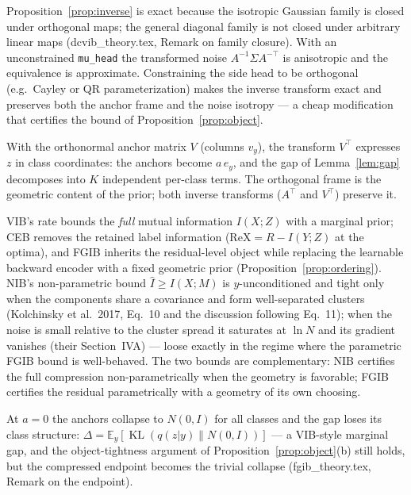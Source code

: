 \begin{remark}\label{rem:orth}
Proposition~\ref{prop:inverse} is exact because the isotropic Gaussian family is closed
under orthogonal maps; the general diagonal family is not closed under arbitrary linear
maps (dcvib\_theory.tex, Remark on family closure). With an unconstrained \texttt{mu\_head}
the transformed noise $A^{-1}\Sigma A^{-\top}$ is anisotropic and the equivalence is
approximate. Constraining the side head to be orthogonal (e.g.\ Cayley or QR
parameterization) makes the inverse transform exact and preserves both the anchor frame
and the noise isotropy --- a cheap modification that certifies the bound of
Proposition~\ref{prop:object}.
\end{remark}

\begin{remark}\label{rem:frame}
With the orthonormal anchor matrix $V$ (columns $v_y$), the transform $V^{\top}$ expresses
$z$ in class coordinates: the anchors become $a\,e_y$, and the gap of
Lemma~\ref{lem:gap} decomposes into $K$ independent per-class terms. The orthogonal frame
is the geometric content of the prior; both inverse transforms ($A^{\top}$ and $V^{\top}$)
preserve it.
\end{remark}

\begin{remark}\label{rem:position}
VIB's rate bounds the \emph{full} mutual information $I(X;Z)$ with a marginal prior;
CEB removes the retained label information ($\mathrm{ReX} = R - I(Y;Z)$ at the optima),
and FGIB inherits the residual-level object while replacing the learnable backward
encoder with a fixed geometric prior (Proposition~\ref{prop:ordering}).
NIB's non-parametric bound $\widehat I \ge I(X;M)$ is $y$-unconditioned and tight only
when the components share a covariance and form well-separated clusters (Kolchinsky et
al.\ 2017, Eq.~10 and the discussion following Eq.~11); when the noise is small relative
to the cluster spread it saturates at $\ln N$ and its gradient vanishes (their
Section~IVA) --- loose exactly in the regime where the parametric FGIB bound is
well-behaved. The two bounds are complementary: NIB certifies the full compression
non-parametrically when the geometry is favorable; FGIB certifies the residual
parametrically with a geometry of its own choosing.
\end{remark}

\begin{remark}\label{rem:a0}
At $a = 0$ the anchors collapse to $N(0, I)$ for all classes and the gap loses its class
structure: $\Delta = \mathbb{E}_y[\operatorname{KL}(q(z|y)\|N(0,I))]$ --- a VIB-style
marginal gap, and the object-tightness argument of
Proposition~\ref{prop:object}(b) still holds, but the compressed endpoint becomes the
trivial collapse (fgib\_theory.tex, Remark on the endpoint).
\end{remark}
